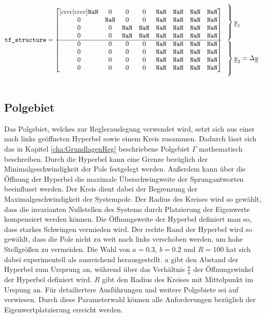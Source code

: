 \begin{align*}
	\texttt{tf\_structure} = \begin{bmatrix}[cccc|cccc]
	\texttt{NaN} & 0 & 0 & 0 & \texttt{NaN} & \texttt{NaN} & \texttt{NaN} & \texttt{NaN} \\
	0 & \texttt{NaN} & 0 & 0 & \texttt{NaN} & \texttt{NaN} & \texttt{NaN} & \texttt{NaN} \\
	0 & 0 & \texttt{NaN} & \texttt{NaN} & \texttt{NaN} & \texttt{NaN} & \texttt{NaN} & \texttt{NaN} \\
	0 & 0 & \texttt{NaN} & \texttt{NaN} & \texttt{NaN} & \texttt{NaN} & \texttt{NaN} & \texttt{NaN} \\
	\hline
	0 & 0 & 0 & 0 & \texttt{NaN} & \texttt{NaN} & \texttt{NaN} & \texttt{NaN} \\
	0 & 0 & 0 & 0 & \texttt{NaN} & \texttt{NaN} & \texttt{NaN} & \texttt{NaN} \\
	0 & 0 & 0 & 0 & \texttt{NaN} & \texttt{NaN} & \texttt{NaN} & \texttt{NaN} \\
	0 & 0 & 0 & 0 & \texttt{NaN} & \texttt{NaN} & \texttt{NaN} & \texttt{NaN} 
	\end{bmatrix}
	 \begin{array}{l}
	\\
	\MyLBrace{7ex}{$\underline{y}_1$}
	\\ 
	\MyLBrace{7ex}{$\underline{y}_2 = \Delta\underline{y}$}
	\\
	\\
	\end{array}
\end{align*}

\subsection{Polgebiet}
Das Polgebiet, welches zur Reglerauslegung verwendet wird, setzt sich aus einer nach links geöffneten Hyperbel sowie einem Kreis zusammen. Dadurch lässt sich das in Kapitel \ref{cha:GrundlagenReg} beschriebene Polgebiet $\Gamma$ mathematisch beschreiben. Durch die Hyperbel kann eine Grenze bezüglich der Minimalgeschwindigkeit der Pole festgelegt werden. Außerdem kann über die Öffnung der Hyperbel die maximale Überschwingweite der Sprungantworten beeinflusst werden. Der Kreis dient dabei der Begrenzung der Maximalgeschwindigkeit der Systempole. Der Radius des Kreises wird so gewählt, dass die invarianten Nullstellen des Systems durch Platzierung der Eigenwerte kompensiert werden können. Die Öffnungsweite der Hyperbel definiert man so, dass starkes Schwingen vermieden wird. Der rechte Rand der Hyperbel wird so gewählt, dass die Pole nicht zu weit nach links verschoben werden, um hohe Stellgrößen zu vermeiden. Die Wahl von $a = 0.3$, $b=0.2$ und $R=100$ hat sich dabei experimentell als ausreichend herausgestellt. $a$ gibt den Abstand der Hyperbel zum Ursprung an, während über das Verhältnis $\frac{b}{a}$ der Öffnungswinkel der Hyperbel definiert wird. $R$ gibt den Radius des Kreises mit Mittelpunkt im Urspung an. Für detailiertere Ausführungen und weitere Polgebiete sei auf \cite{gammaDoku} verwiesen. Durch diese Parameterwahl können alle Anforderungen bezüglich der Eigenwertplatzierung erreicht werden.
